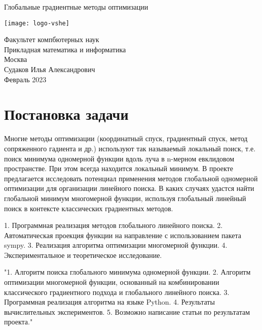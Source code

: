 \documentclass{article}
\begin{document}
    \begin{center}
    \begin{huge}
    Глобальные градиентные методы оптимизации\\
    \end{huge}

    \vspace{1.8cm}
    \texttt{[image: logo-vshe]}

    \vspace{7cm}

    Факультет компбютерных наук\\
    Прикладная математика и информатика\\
    Москва\\

    \vspace{1cm}
    Судаков Илья Александрович\\
    Февраль 2023\\
    \end{center}

\pagebreak

    \newpage
    \section{Постановка задачи}
    Многие методы оптимизации (координатный спуск, градиентный спуск, метод сопряженного гадиента и др.) используют так называемый локальный поиск, т.е. поиск минимума одномерной функции вдоль луча в n-мерном евклидовом пространстве. При этом всегда находится локальный минимум. В проекте предлагается исследовать потенциал применения методов глобальной одномерной оптимизации для организации линейного поиска. В каких случаях удастся найти глобальной минимум многомерной функции, используя глобальный линейный поиск в контексте классических градиентных методов.


    1. Программная реализация методов глобального линейного поиска. 2. Автоматическая проекция функции на направление с использованием пакета sympy. 3. Реализация алгоритма оптимизации многомерной функции. 4. Экспериментальное и теоретическое исследование.


    "1. Алгоритм поиска глобального минимума одномерной функции.
    2. Алгоритм оптимизации многомерной функции, основанный на комбинировании классического градиентного подхода и глобального линейного поиска.
    3. Программная реализация алгоритма на языке Python.
    4. Результаты вычислительных экспериментов.
    5. Возможно написание статьи по результатам проекта."
\end{document}
